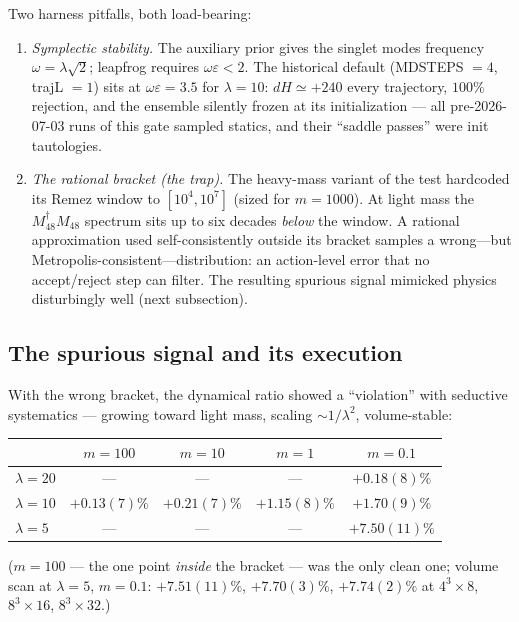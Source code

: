 \documentclass[11pt]{article}
\begin{document}
Two harness pitfalls, both load-bearing:
\begin{enumerate}
\item \emph{Symplectic stability.}  The auxiliary prior gives the singlet
modes frequency $\omega=\lambda\sqrt2$; leapfrog requires
$\omega\varepsilon<2$.  The historical default (MDSTEPS $=4$, trajL $=1$)
sits at $\omega\varepsilon=3.5$ for $\lambda=10$: $dH\simeq+240$ every
trajectory, $100\%$ rejection, and the ensemble silently frozen at its
initialization --- all pre-2026-07-03 runs of this gate sampled statics,
and their ``saddle passes'' were init tautologies.
\item \emph{The rational bracket (the trap).}  The heavy-mass variant of
the test hardcoded its Remez window to $[10^{4},10^{7}]$ (sized for
$m=1000$).  At light mass the $M_{48}^{\dagger}M_{48}$ spectrum sits up to
six decades \emph{below} the window.  A rational approximation used
self-consistently outside its bracket samples a wrong---but
Metropolis-consistent---distribution: an action-level error that no
accept/reject step can filter.  The resulting spurious signal mimicked
physics disturbingly well (next subsection).
\end{enumerate}

\subsection{The spurious signal and its execution}

With the wrong bracket, the dynamical ratio showed a ``violation'' with
seductive systematics --- growing toward light mass, scaling
$\sim1/\lambda^{2}$, volume-stable:
\begin{center}
\begin{tabular}{lcccc}
\toprule
 & $m=100$ & $m=10$ & $m=1$ & $m=0.1$\\
\midrule
$\lambda=20$ & --- & --- & --- & $+0.18(8)\%$\\
$\lambda=10$ & $+0.13(7)\%$ & $+0.21(7)\%$ & $+1.15(8)\%$ & $+1.70(9)\%$\\
$\lambda=5$  & --- & --- & --- & $+7.50(11)\%$\\
\bottomrule
\end{tabular}
\end{center}
($m=100$ --- the one point \emph{inside} the bracket --- was the only clean
one; volume scan at $\lambda=5$, $m=0.1$: $+7.51(11)\%$, $+7.70(3)\%$,
$+7.74(2)\%$ at $4^{3}\times8$, $8^{3}\times16$, $8^{3}\times32$.)
\end{document}
